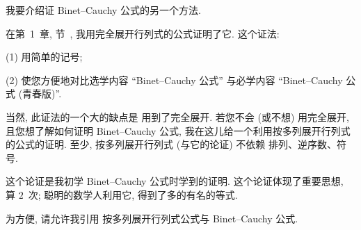 \documentclass[../libro.tex]{subfiles}
\begin{document}
我要介绍证 Binet--Cauchy 公式的另一个方法.

在第~1~章, 节~,
我用完全展开行列式的公式证明了它.
这个证法:

(1)
用简单的记号;

(2)
使您方便地对比选学内容
``Binet--Cauchy 公式''
与必学内容
``Binet--Cauchy 公式 (青春版)''.

当然, 此证法的一个大的缺点是%
用到了完全展开.
若您不会 (或不想) 用完全展开,
且您想了解如何证明 Binet--Cauchy 公式,
我在这儿给一个利用按多列展开行列式的公式的证明.
至少, 按多列展开行列式 (与它的论证) 不依赖%
排列、逆序数、符号.

这个论证是我初学 Binet--Cauchy 公式时学到的证明.
这个论证体现了重要思想, 算 \(2\)~次;
聪明的数学人利用它, 得到了多的有名的等式.

为方便, 请允许我引用%
按多列展开行列式公式与 Binet--Cauchy 公式.

\end{document}
